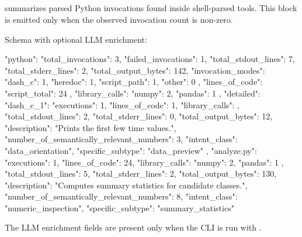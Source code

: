 \documentclass[11pt]{article}
\begin{document}
\subsection*{}

 summarizes parsed Python invocations found inside shell-parsed tools.
This block is emitted only when the observed invocation count is non-zero.

Schema with optional LLM enrichment:

\begin{DocCode}
{
  "python": {
    "total_invocations": 3,
    "failed_invocations": 1,
    "total_stdout_lines": 7,
    "total_stderr_lines": 2,
    "total_output_bytes": 142,
    "invocation_modes": {
      "dash_c": 1,
      "heredoc": 1,
      "script_path": 1,
      "other": 0
    },
    "lines_of_code": {
      "script_total": 24
    },
    "library_calls": {
      "numpy": 2,
      "pandas": 1
    },
    "detailed": {
      "dash_c_1": {
        "executions": 1,
        "lines_of_code": 1,
        "library_calls": {},
        "total_stdout_lines": 2,
        "total_stderr_lines": 0,
        "total_output_bytes": 12,
        "description": "Prints the first few time values.",
        "number_of_semantically_relevant_numbers": 3,
        "intent_class": "data_orientation",
        "specific_subtype": "data_preview"
      },
      "analyze.py": {
        "executions": 1,
        "lines_of_code": 24,
        "library_calls": {
          "numpy": 2,
          "pandas": 1
        },
        "total_stdout_lines": 5,
        "total_stderr_lines": 2,
        "total_output_bytes": 130,
        "description": "Computes summary statistics for candidate classes.",
        "number_of_semantically_relevant_numbers": 8,
        "intent_class": "numeric_inspection",
        "specific_subtype": "summary_statistics"
      }
    }
  }
}
\end{DocCode}
The LLM enrichment fields are present only when the CLI is run with .
\end{document}
